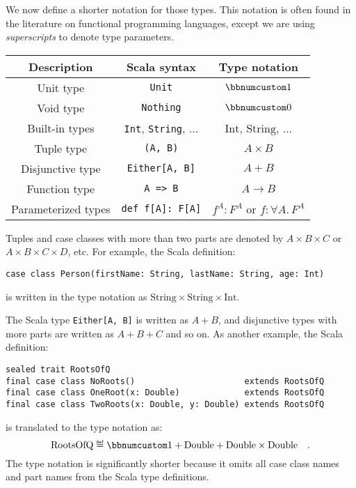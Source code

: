 We now define a shorter notation for those types. This notation is
often found in the literature on functional programming languages,
except we are using \emph{superscripts} to denote type parameters.
\begin{center}
\begin{tabular}{|c|c|c|}
\hline 
\textbf{\small{}Description} & \textbf{\small{}Scala syntax} & \textbf{\small{}Type notation}\tabularnewline
\hline 
\hline 
{\small{}Unit type} & \lstinline!Unit! & $\bbnum 1$\tabularnewline
\hline 
{\small{}Void type} & \lstinline!Nothing! & $\bbnum 0$\tabularnewline
\hline 
{\small{}Built-in types} & {\small{}}\lstinline!Int!{\small{}, }\lstinline!String!{\small{},
...} & {\small{}$\text{Int}$, $\text{String}$, ...}\tabularnewline
\hline 
{\small{}Tuple type} & \lstinline!(A, B)! & $A\times B$\tabularnewline
\hline 
{\small{}Disjunctive type} & \lstinline!Either[A, B]! & $A+B$\tabularnewline
\hline 
{\small{}Function type} & \lstinline!A => B! & $A\rightarrow B$\tabularnewline
\hline 
{\small{}Parameterized types} & \lstinline!def f[A]: F[A]! & $f^{A}:F^{A}${\small{} or $f:\forall A.\,F^{A}$}\tabularnewline
\hline 
\end{tabular} 
\par\end{center}

Tuples and case classes with more than two parts are denoted by $A\times B\times C$
or $A\times B\times C\times D$, etc. For example, the Scala definition:
\begin{lstlisting}
case class Person(firstName: String, lastName: String, age: Int)
\end{lstlisting}
is written in the type notation as $\text{String}\times\text{String}\times\text{Int}$. 

The Scala type \lstinline!Either[A, B]! is written as $A+B$, and
disjunctive types with more parts are written as $A+B+C$ and so on.
As another example, the Scala definition:
\begin{lstlisting}
sealed trait RootsOfQ
final case class NoRoots()                      extends RootsOfQ
final case class OneRoot(x: Double)             extends RootsOfQ
final case class TwoRoots(x: Double, y: Double) extends RootsOfQ
\end{lstlisting}
is translated to the type notation as:
\[
\text{RootsOfQ}\triangleq\bbnum 1+\text{Double}+\text{Double}\times\text{Double}\quad.
\]
The type notation is significantly shorter because it omits all case
class names and part names from the Scala type definitions.

